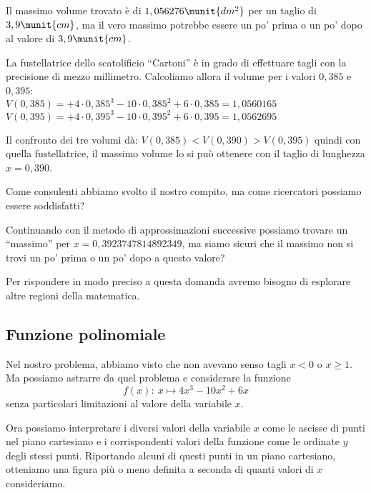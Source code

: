 Il massimo volume trovato è di \(1,056276\munit{dm^2}\) per un taglio di 
\(3,9\munit{cm}\), ma il vero massimo potrebbe essere un po' prima o un 
po' dopo al valore di \(3,9\munit{cm}\).

La fustellatrice dello scatolificio ``Cartoni'' è in grado di effettuare 
tagli con la precisione di mezzo millimetro.
Calcoliamo allora il volume per i valori \(0,385\) e \(0,395\):\\ 
\(V(0,385) = +4 \cdot 0,385^3 -10 \cdot 0,385^2 +6 \cdot 0,385=1,0560165\)\\
\(V(0,395) = +4 \cdot 0,395^3 -10 \cdot 0,395^2 +6 \cdot 0,395=1,0562695\)

Il confronto dei tre volumi dà:\quad 
\(V(0,385) < V(0,390) > V(0,395)\) \quad 
quindi con quella fustellatrice, il massimo volume lo si può ottenere con 
il taglio di lunghezza \(x = 0,390\).

Come consulenti abbiamo svolto il nostro compito, ma come ricercatori 
possiamo essere soddisfatti?

Continuando con il metodo di approssimazioni successive possiamo trovare 
un ``massimo'' per \(x=0,3923747814892349\), ma siamo sicuri che il 
massimo non si trovi un po' prima o un po' dopo a questo valore?

Per rispondere in modo preciso a questa domanda avremo bisogno di 
esplorare altre regioni della matematica.

\subsection{Funzione polinomiale}

Nel nostro problema, abbiamo visto che non avevano senso tagli 
\(x < 0\) o \(x \geqslant 1\).
Ma possiamo astrarre da quel problema e considerare la funzione 
\[f(x):~ x \mapsto 4x^3 -10x^2 +6x\]
senza particolari limitazioni al valore della variabile \(x\).

Ora possiamo interpretare i diversi valori della variabile \(x\) come le 
ascisse di punti nel piano cartesiano e i corrispondenti valori della 
funzione come le ordinate \(y\) degli stessi punti.
Riportando alcuni di questi punti in un piano cartesiano, otteniamo una 
figura più o meno definita a seconda di quanti valori di \(x\) 
consideriamo.

